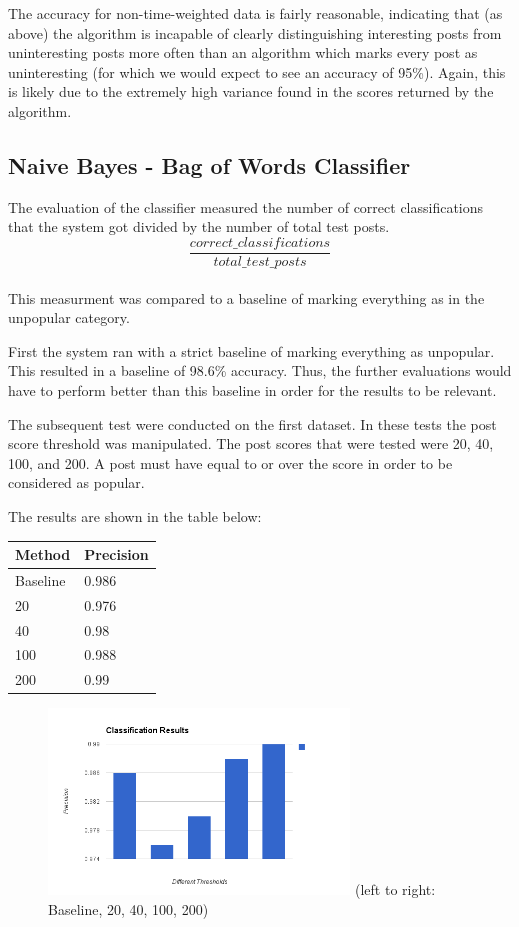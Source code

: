\documentclass{acm_proc_article-sp}
\begin{document}
The accuracy for non-time-weighted data is fairly reasonable, indicating that (as above) the algorithm is incapable
of clearly distinguishing interesting posts from uninteresting posts more often than an algorithm which marks
every post as uninteresting (for which we would expect to see an accuracy of 95\%).
Again, this is likely due to the extremely high variance found in the scores returned by the
algorithm.

\subsection{Naive Bayes - Bag of Words Classifier}
The evaluation of the classifier measured the number of correct classifications that the system got divided by the number of total test posts.\\
$$\frac{correct\_classifications}{total\_test\_posts}$$\\
This measurment was compared to a baseline of marking everything as in the unpopular category.

First the system ran with a strict baseline of marking everything as unpopular. This resulted in a baseline of 98.6\% accuracy. Thus, the further evaluations would have to perform better than this baseline in order for the results to be relevant.

The subsequent test were conducted on the first dataset. In these tests the post score threshold was manipulated. The post scores that were tested were 20, 40, 100, and 200. A post must have equal to or over the score in order to be considered as popular. 

The results are shown in the table below:\\
\begin{tabular}{l|l}
Method & Precision\\
\hline
Baseline & 0.986\\
20 & 0.976\\
40 & 0.98\\
100 & 0.988\\
200 & 0.99\\
\end{tabular}

\begin{figure}[h!]
\includegraphics[width=8cm]{dataset-keyword.png}
(left to right: Baseline, 20, 40, 100, 200)
\end{figure}
\end{document}

